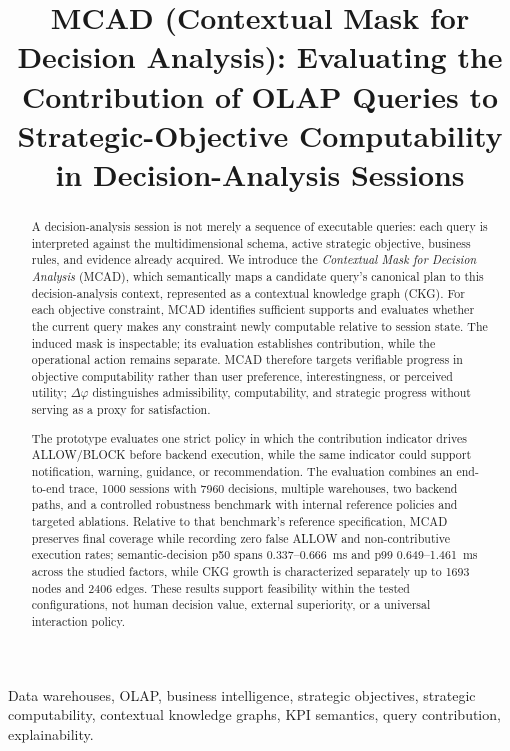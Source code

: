 \documentclass[journal]{IEEEtran}
\begin{document}
\title{MCAD (Contextual Mask for Decision Analysis): Evaluating the Contribution of OLAP Queries to Strategic-Objective Computability in Decision-Analysis Sessions}
\author{}
\maketitle
\pagestyle{plain}
\thispagestyle{plain}

\begin{abstract}
A decision-analysis session is not merely a sequence of executable queries: each query is interpreted against the multidimensional schema, active strategic objective, business rules, and evidence already acquired. We introduce the \emph{Contextual Mask for Decision Analysis} (MCAD), which semantically maps a candidate query's canonical plan to this decision-analysis context, represented as a contextual knowledge graph (CKG). For each objective constraint, MCAD identifies sufficient supports and evaluates whether the current query makes any constraint newly computable relative to session state. The induced mask is inspectable; its evaluation establishes contribution, while the operational action remains separate. MCAD therefore targets verifiable progress in objective computability rather than user preference, interestingness, or perceived utility; $\Delta\varphi$ distinguishes admissibility, computability, and strategic progress without serving as a proxy for satisfaction.

The prototype evaluates one strict policy in which the contribution indicator drives ALLOW/BLOCK before backend execution, while the same indicator could support notification, warning, guidance, or recommendation. The evaluation combines an end-to-end trace, 1000 sessions with 7960 decisions, multiple warehouses, two backend paths, and a controlled robustness benchmark with internal reference policies and targeted ablations. Relative to that benchmark's reference specification, MCAD preserves final coverage while recording zero false ALLOW and non-contributive execution rates; semantic-decision p50 spans 0.337--0.666~ms and p99 0.649--1.461~ms across the studied factors, while CKG growth is characterized separately up to 1693 nodes and 2406 edges. These results support feasibility within the tested configurations, not human decision value, external superiority, or a universal interaction policy.
\end{abstract}

\begin{IEEEkeywords}
Data warehouses, OLAP, business intelligence, strategic objectives, strategic computability, contextual knowledge graphs, KPI semantics, query contribution, explainability.
\end{IEEEkeywords}
\end{document}
